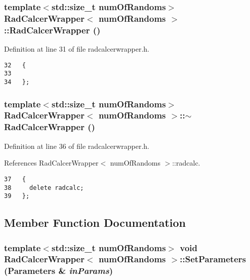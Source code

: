 \subsubsection{\setlength{\rightskip}{0pt plus 5cm}template$<$std::size\_\-t numOfRandoms$>$ {\bf RadCalcerWrapper}$<$ numOfRandoms $>$::{\bf RadCalcerWrapper} ()\hspace{0.3cm}{\tt  [inline]}}\label{classRadCalcerWrapper_529946c8f674506ae65fc3d5d7db7539}




Definition at line 31 of file radcalcerwrapper.h.

\begin{Code}\begin{verbatim}32   {
33 
34   };
\end{verbatim}
\end{Code}


\subsubsection{\setlength{\rightskip}{0pt plus 5cm}template$<$std::size\_\-t numOfRandoms$>$ {\bf RadCalcerWrapper}$<$ numOfRandoms $>$::$\sim${\bf RadCalcerWrapper} ()\hspace{0.3cm}{\tt  [inline]}}\label{classRadCalcerWrapper_ab7d609bfbe44c77f650df7d82e977ec}




Definition at line 36 of file radcalcerwrapper.h.

References RadCalcerWrapper$<$ numOfRandoms $>$::radcalc.

\begin{Code}\begin{verbatim}37   {
38     delete radcalc;
39   };
\end{verbatim}
\end{Code}




\subsection{Member Function Documentation}
\subsubsection{\setlength{\rightskip}{0pt plus 5cm}template$<$std::size\_\-t numOfRandoms$>$ void {\bf RadCalcerWrapper}$<$ numOfRandoms $>$::SetParameters ({\bf Parameters} \& {\em inParams})\hspace{0.3cm}{\tt  [inline]}}\label{classRadCalcerWrapper_9ab907c24f56fb67aefdfbe03550171c}




